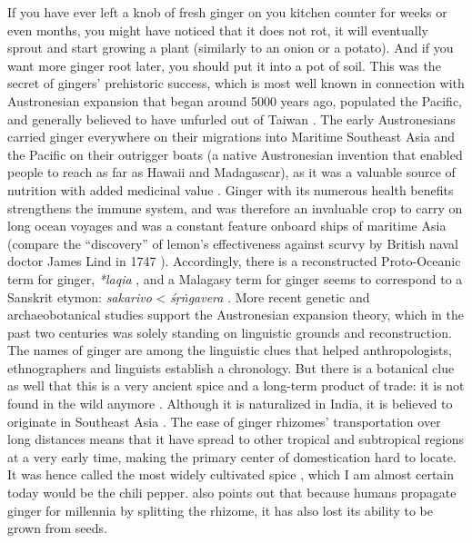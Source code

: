 If you have ever left a knob of fresh ginger on you kitchen counter for weeks or even months, you might have noticed that it does not rot, it will eventually sprout and start growing a plant (similarly to an onion or a potato). And if you want more ginger root later, you should put it into a pot of soil. This was the secret of gingers' prehistoric success, which is most well known in connection with Austronesian expansion that began around 5000 years ago, populated the Pacific, and generally believed to have unfurled out of Taiwan \autocite{mirabal_ascertaining_2013}. The early Austronesians carried ginger everywhere on their migrations into Maritime Southeast Asia and the Pacific on their outrigger boats (a native Austronesian invention that enabled people to reach as far as Hawaii and Madagascar), as it was a valuable source of nutrition with added medicinal value \autocite[see][21-25]{dalby_dangerous_2000}. Ginger with its numerous health benefits strengthens the immune system, and was therefore an invaluable crop to carry on long ocean voyages and was a constant feature onboard ships of maritime Asia (compare the ``discovery'' of lemon's effectiveness against scurvy by British naval doctor James Lind in 1747 \autocite{allan_finding_2021}). Accordingly, there is a reconstructed Proto-Oceanic term for ginger, \textit{*laqia} \autocite[52]{bellwood_austronesians_2006}, and a Malagasy term for ginger seems to correspond to a Sanskrit etymon: \textit{sakarivo} < \textit{śṛṅgavera} \autocite[41]{adelaar_malay_1994}. More recent genetic and archaeobotanical studies support the Austronesian expansion theory, which in the past two centuries was solely standing on linguistic grounds and reconstruction. The names of ginger are among the linguistic clues that helped anthropologists, ethnographers and linguists establish a chronology. But there is a botanical clue as well that this is a very ancient spice and a long-term product of trade: it is not found in the wild anymore \autocite{ravindran_ginger_2005}. Although it is naturalized in India, it is believed to originate in Southeast Asia \autocite{ravindran_ginger_2005}. The ease of ginger rhizomes' transportation over long distances means that it have spread to other tropical and subtropical regions at a very early time, making the primary center of domestication hard to locate. It was hence called the most widely cultivated spice \autocite{lawrence_major_1984}, which I am almost certain today would be the chili pepper. \textcite{dalby_dangerous_2000} also points out that because humans propagate ginger for millennia by splitting the rhizome, it has also lost its ability to be grown from seeds.

